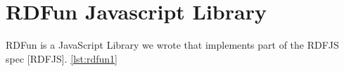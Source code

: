 \chapter{RDFun Javascript Library}

RDFun is a JavaScript Library we wrote that implements part of the RDFJS spec [RDFJS]. \ref{lst:rdfun1}



\newpage


